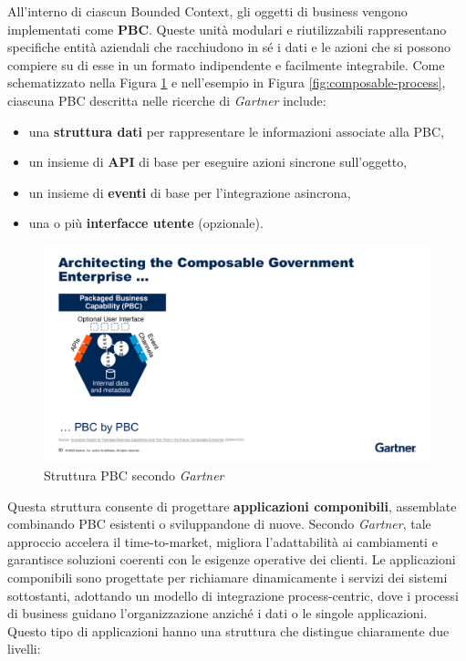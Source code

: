 All’interno di ciascun Bounded Context, gli oggetti di business vengono implementati come \textbf{\ac{PBC}}.
Queste unità modulari e riutilizzabili rappresentano specifiche entità aziendali che racchiudono in sé i dati e le azioni che
si possono compiere su di esse in un formato indipendente e facilmente integrabile. Come schematizzato nella Figura \ref{fig:pbc-struttura}
e nell’esempio in Figura \ref{fig:composable-process}, ciascuna \ac{PBC} descritta nelle ricerche di \textit{Gartner}\cite{natis2019innovation}\cite{burke2020top} include:

\begin{itemize}
    \item una \textbf{struttura dati} per rappresentare le informazioni associate alla \ac{PBC},
    \item un insieme di \textbf{API} di base per eseguire azioni sincrone sull'oggetto,
    \item un insieme di \textbf{eventi} di base per l'integrazione asincrona,
    \item una o più \textbf{interfacce utente} (opzionale).
\end{itemize}

\begin{figure}
    \centering
    \includegraphics[scale=0.6]{figures/PBCstructure.pdf}
    \caption{Struttura PBC secondo \textit{Gartner}}
    \label{fig:pbc-struttura}
\end{figure}

Questa struttura consente di progettare \textbf{applicazioni componibili}, assemblate combinando \ac{PBC} esistenti o sviluppandone di nuove.
Secondo \textit{Gartner}, tale approccio accelera il time-to-market, migliora l’adattabilità ai cambiamenti e garantisce soluzioni coerenti
con le esigenze operative dei clienti. Le applicazioni componibili sono progettate per richiamare dinamicamente i servizi dei
sistemi sottostanti, adottando un modello di integrazione process-centric, dove i processi di business guidano l’organizzazione
anziché i dati o le singole applicazioni. Questo tipo di applicazioni hanno una struttura che distingue chiaramente due livelli:

